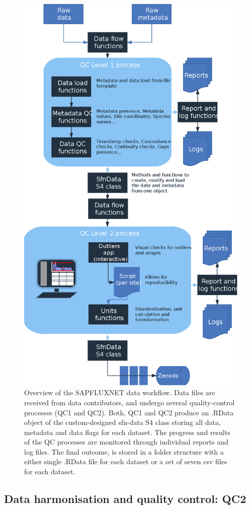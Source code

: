 \documentclass[11pt,twoside]{reedthesis}
\begin{document}
\setlength{\abovecaptionskip}{0pt}
\begin{figure}[H]

{\centering \includegraphics[width=0.6\linewidth]{figure/CH3/Figure1} 

}

\caption[Overview of the SAPFLUXNET data workflow.]{Overview of the SAPFLUXNET data workflow. Data files are received from data contributors, and undergo several quality-control processes (QC1 and QC2). Both, QC1 and QC2 produce an .RData object of the custom-designed sfn-data S4 class storing all data, metadata and data flags for each dataset. The progress and results of the QC processes are monitored through individual reports and log files. The final outcome, is stored in a folder structure with a either single .RData file for each dataset or a set of seven csv files for each dataset.}\label{fig:Ch2plot1}
\end{figure}
\subsection{Data harmonisation and quality control:
QC2}\label{data-harmonisation-and-quality-control-qc2}
\end{document}
